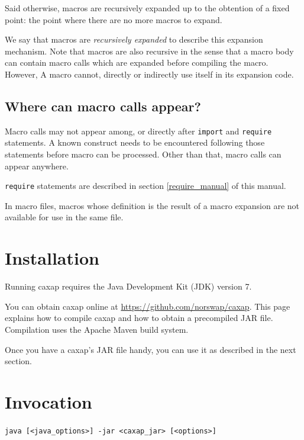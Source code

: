 Said otherwise, macros are recursively expanded up to the obtention of a fixed
point: the point where there are no more macros to expand.

We say that macros are \emph{recursively expanded} to describe this expansion
mechanism. Note that macros are also recursive in the sense that a macro body
can contain macro calls which are expanded before compiling the macro. However,
A macro cannot, directly or indirectly use itself in its expansion code.

\subsection{Where can macro calls appear?}

Macro calls may not appear among, or directly after \texttt{import} and
\texttt{require} statements. A known construct needs to be encountered following
those statements before macro can be processed. Other than that, macro calls can
appear anywhere.

\texttt{require} statements are described in section \ref{require_manual} of
this manual.

In macro files, macros whose definition is the result of a macro expansion are
not available for use in the same file.

\section{Installation}

Running caxap requires the Java Development Kit (JDK) version 7.

You can obtain caxap online at \url{https://github.com/norswap/caxap}. This page
explains how to compile caxap and how to obtain a precompiled JAR
file. Compilation uses the Apache Maven build system.

Once you have a caxap's JAR file handy, you can use it as described in the next
section.

\section{Invocation}

\texttt{java [<java_options>] -jar <caxap_jar> [<options>]}

